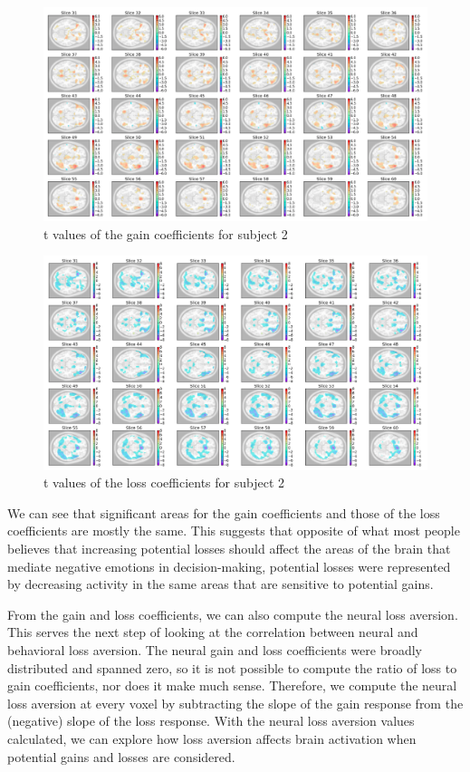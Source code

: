 \documentclass[11pt]{article}
\begin{document}
\begin{figure}[H]
    \centering
      \includegraphics[scale=0.4]{figures/Regression2/t_gain_standard_sub2.png}
    \caption{t values of the gain coefficients for subject 2}
\end{figure}

\begin{figure}[H]
    \centering
      \includegraphics[scale=0.4]{figures/Regression2/t_loss_standard_sub2.png}
    \caption{t values of the loss coefficients for subject 2}
\end{figure}

We can see that significant areas for the gain coefficients and those of the 
loss coefficients are mostly the same. This suggests that opposite of what 
most people believes that increasing potential losses should affect the areas 
of the brain that mediate negative emotions in decision-making, potential 
losses were represented by decreasing activity in the same areas that are 
sensitive to potential gains.

From the gain and loss coefficients, we can also compute the neural loss
aversion. This serves the next step of looking at the correlation between
neural and behavioral loss aversion. The neural gain and loss coefficients
were broadly distributed and spanned zero, so it is not possible to compute
the ratio of loss to gain coefficients, nor does it make much sense.
Therefore, we compute the neural loss aversion at every voxel by subtracting
the slope of the gain response from the (negative) slope of the loss response.
With the neural loss aversion values calculated, we can explore how loss
aversion affects brain activation when potential gains and losses are
considered.
\end{document}
